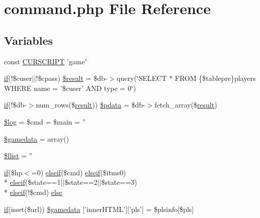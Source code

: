 \hypertarget{command_8php}{\section{command.\+php File Reference}
\label{command_8php}
}
\subsection*{Variables}
\begin{DoxyCompactItemize}
\item 
const \hyperlink{command_8php_a39c39f525eceb86cabc338804f230e80}{C\+U\+R\+S\+C\+R\+I\+P\+T} 'game'
\item 
\hyperlink{login__old_8php_a4ac1118c2e44c513a674bc1793ba6c90}{if}(!\$cuser$\vert$$\vert$!\$cpass) \hyperlink{command_8php_a112ef069ddc0454086e3d1e6d8d55d07}{\$result} = \$db-\/$>$query(\char`\"{}S\+E\+L\+E\+C\+T $\ast$ F\+R\+O\+M \{\$tablepre\}players W\+H\+E\+R\+E name = '\$cuser' A\+N\+D type = 0\char`\"{})
\item 
\hyperlink{login__old_8php_a4ac1118c2e44c513a674bc1793ba6c90}{if}(!\$db-\/$>$num\+\_\+rows(\$\hyperlink{templates_2install_8php_abdecde238169a1e34f68354fc9968af0}{result})) \hyperlink{command_8php_a6378350bbbdfdf1fdd8c8e1cd0607a8d}{\$pdata} = \$db-\/$>$fetch\+\_\+array(\$\hyperlink{templates_2install_8php_abdecde238169a1e34f68354fc9968af0}{result})
\item 
\hyperlink{command_8php_a9a2cf15a653aee8be437f7ae474cd494}{\$log} = \$cmd = \$main = ''
\item 
\hyperlink{command_8php_a2c99f4f40b60cc6b3b312c14ee101085}{\$gamedata} = array()
\item 
\hyperlink{command_8php_a5d54a0278e200a0ff8007926c5dd2a10}{\$llist} = ''
\item 
\hyperlink{login__old_8php_a4ac1118c2e44c513a674bc1793ba6c90}{if}(\$hp$<$=0) \hyperlink{urlist_8php_a77f52b43f81ed05a41b68c2161789055}{elseif}(\$cmd) \hyperlink{urlist_8php_a77f52b43f81ed05a41b68c2161789055}{elseif}(\$itms0) \\*
\hyperlink{urlist_8php_a77f52b43f81ed05a41b68c2161789055}{elseif}(\$state==1$\vert$$\vert$\$state==2$\vert$$\vert$\$state==3) \\*
\hyperlink{urlist_8php_a77f52b43f81ed05a41b68c2161789055}{elseif}(!\$cmd) \hyperlink{command_8php_a3b5760e545e497c5b3121939c8315e0e}{else}
\item 
\hyperlink{login__old_8php_a4ac1118c2e44c513a674bc1793ba6c90}{if}(isset(\$url)) \hyperlink{command_8php_ac9b663b3bbed4178f8fa8fec9a95a6af}{\$gamedata} \mbox{[}'inner\+H\+T\+M\+L'\mbox{]}\mbox{[}'pls'\mbox{]} = \$plsinfo\mbox{[}\$pls\mbox{]}
$$
\end{DoxyCompactItemize}
